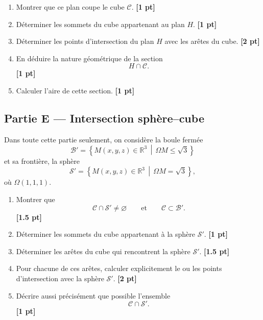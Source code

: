 \documentclass[11pt,a4paper]{article}
\newcommand{\R}{\mathbb{R}}
\newcommand{\Boule}{\mathcal{B}}
\newcommand{\Sphere}{\mathcal{S}}
\newcommand{\Cube}{\mathcal{C}}
\newcommand{\barq}[1]{\hfill{\small\textbf{[#1 pt]}}}
\begin{document}
\begin{enumerate}[label=\textbf{\arabic*.},resume]
    \item Montrer que ce plan coupe le cube \(\Cube\). \barq{1}

    \item Déterminer les sommets du cube appartenant au plan \(H\). \barq{1}

    \item Déterminer les points d'intersection du plan \(H\) avec les arêtes du cube. \barq{2}

    \item En déduire la nature géométrique de la section
    \[
    H\cap \Cube.
    \]
    \barq{1}

    \item Calculer l'aire de cette section. \barq{1}
\end{enumerate}

\subsection*{Partie E --- Intersection sphère--cube}

Dans toute cette partie seulement, on considère la boule fermée
\[
\Boule'=\left\{M(x,y,z)\in\R^3 \,\middle|\, \Omega M\le \sqrt3\right\}
\]
et sa frontière, la sphère
\[
\Sphere'=\left\{M(x,y,z)\in\R^3 \,\middle|\, \Omega M=\sqrt3\right\},
\]
où \(\Omega(1,1,1)\).

\begin{enumerate}[label=\textbf{\arabic*.},resume]
    \item Montrer que
    \[
    \Cube\cap \Sphere'\neq \varnothing
    \qquad\text{et}\qquad
    \Cube\subset \Boule'.
    \]
    \barq{1.5}

    \item Déterminer les sommets du cube appartenant à la sphère \(\Sphere'\). \barq{1}

    \item Déterminer les arêtes du cube qui rencontrent la sphère \(\Sphere'\). \barq{1.5}

    \item Pour chacune de ces arêtes, calculer explicitement le ou les points d'intersection avec la sphère \(\Sphere'\). \barq{2}

    \item Décrire aussi précisément que possible l'ensemble
    \[
    \Cube\cap \Sphere'.
    \]
    \barq{1}
\end{enumerate}
\end{document}
